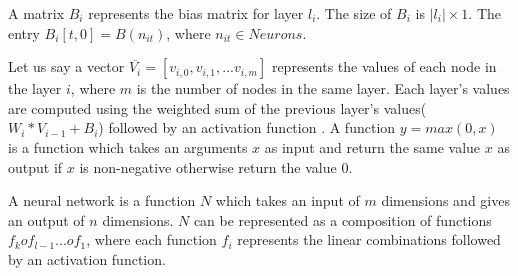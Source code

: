 \begin{df}
    A matrix $B_i$ represents the bias matrix for layer $l_i$. The size of $B_i$ is $|l_i|\times 1$. 
    The entry $B_i[t,0] = B(n_{it})$, where $n_{it} \in Neurons$. 
\end{df}


Let us say a vector $\overline{V_i} = [v_{i,0}, v_{i,1}, ... v_{i,m}]$ represents the values of each node 
in the layer $i$, where $m$ is the number of nodes in the same layer.
Each layer's values are computed using the weighted sum of the previous layer's values($W_i * V_{i-1} + B_i$) 
followed by an activation function \relu{}. A function $y = max(0,x)$ is a \relu{} function which 
takes an arguments $x$ as input and return the same value $x$ as output if $x$ is non-negative otherwise 
return the value 0. 

A neural network is a function $N$ which takes an input of $m$ dimensions and gives an output of $n$ dimensions.
$N$ can be represented as a composition of functions $f_k o f_{l-1} ... o f_1$, where each function $f_i$ 
represents the linear combinations followed by an activation function. 



